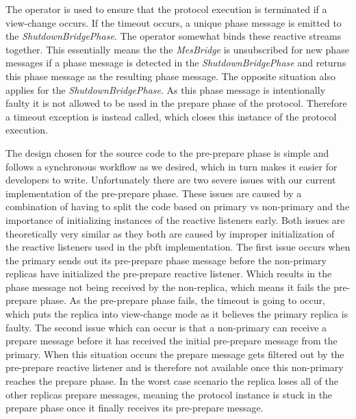 The  operator is used to ensure that the protocol execution is terminated if a view-change occurs. If the timeout occurs, a unique phase message is emitted to the  \emph{ShutdownBridgePhase}. The  operator somewhat binds these reactive streams together. This essentially means the the \emph{MesBridge}  is unsubscribed for new phase messages if a phase message is detected in the \emph{ShutdownBridgePhase} and returns this phase message as the resulting phase message. The opposite situation also applies for the \emph{ShutdownBridgePhase}. As this phase message is intentionally faulty it is not allowed to be used in the prepare phase of the protocol. Therefore a timeout exception is instead called, which closes this instance of the protocol execution.

The design chosen for the source code to the pre-prepare phase is simple and follows a synchronous workflow as we desired, which in turn makes it easier for developers to write. Unfortunately there are two severe issues with our current implementation of the pre-prepare phase. These issues are caused by a combination of having to split the code based on primary vs non-primary and the importance of initializing instances of the reactive listeners early. Both issues are theoretically very similar as they both are caused by improper initialization of the reactive listeners used in the \ac{pbft} implementation. The first issue occurs when the primary sends out its pre-prepare phase message before the non-primary replicas have initialized the pre-prepare reactive listener. Which results in the phase message not being received by the non-replica, which means it fails the pre-prepare phase. As the pre-prepare phase fails, the timeout is going to occur, which puts the replica into view-change mode as it believes the primary replica is faulty. The second issue which can occur is that a non-primary can receive a prepare message before it has received the initial pre-prepare message from the primary. When this situation occurs the prepare message gets filtered out by the pre-prepare reactive listener and is therefore not available once this non-primary reaches the prepare phase. In the worst case scenario the replica loses all of the other replicas prepare messages, meaning the protocol instance is stuck in the prepare phase once it finally receives its pre-prepare message.

